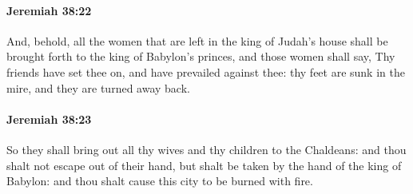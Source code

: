		\paragraph{Jeremiah 38:22} %
			\label{JEREMIAH-38-22}

			And, behold, all the women that are left in the king of Judah’s house shall be brought forth to the king of Babylon’s princes, and those women shall say, Thy friends have set thee on, and have prevailed against thee: thy feet are sunk in the mire, and they are turned away back.


		\paragraph{Jeremiah 38:23} %
			\label{JEREMIAH-38-23}

			So they shall bring out all thy wives and thy children to the Chaldeans: and thou shalt not escape out of their hand, but shalt be taken by the hand of the king of Babylon: and thou shalt cause this city to be burned with fire.

